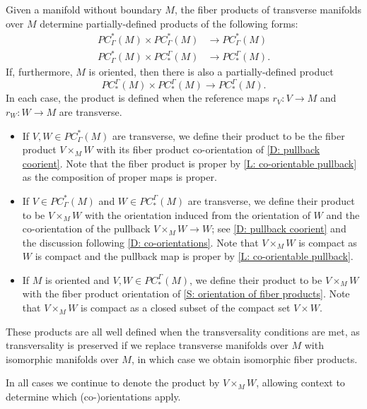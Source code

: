 \begin{definition}\label{D: PC products}
	Given a manifold without boundary $M$, the fiber products of transverse manifolds over $M$ determine partially-defined products of the following forms:
	\begin{align*}
		PC^*_\Gamma(M) \times PC^*_\Gamma(M)& \to PC^*_\Gamma(M)\\
		PC^*_\Gamma(M) \times PC_*^\Gamma(M)& \to PC_*^\Gamma(M).
	\end{align*}
	If, furthermore, $M$ is oriented, then there is also a partially-defined product
	$$PC_*^\Gamma(M) \times PC_*^\Gamma(M) \to PC_*^\Gamma(M).$$
	In each case, the product is defined when the reference maps $r_V \colon V \to M$ and $r_W \colon W \to M$ are transverse.

		\begin{itemize}
			\item If $V,W\in PC^*_\Gamma(M)$ are transverse, we define their product to be the fiber product $V \times_M W$ with its fiber product co-orientation of \cref{D: pullback coorient}. Note that the fiber product is proper by \cref{L: co-orientable pullback} as the composition of proper maps is proper.

			\item If $V \in PC^*_\Gamma(M)$ and $W \in PC_*^\Gamma(M)$ are transverse, we define their product to be $V \times_M W$ with the orientation induced from the orientation of $W$ and the co-orientation of the pullback $V \times_M W \to W$; see \cref{D: pullback coorient} and  the discussion following \cref{D: co-orientations}. 
			Note that $V \times_M W$ is compact as $W$ is compact and the pullback map is proper by \cref{L: co-orientable pullback}.

			\item If $M$ is oriented and $V,W \in PC_*^\Gamma(M)$, we define their product to be $V \times_M W$ with the fiber product orientation of \cref{S: orientation of fiber products}. 
			Note that $V \times_M W$ is compact as a closed subset of the compact set $V \times W$.
	\end{itemize}

	These products are all well defined when the transversality conditions are met, as transversality is preserved if we replace transverse manifolds over $M$ with isomorphic manifolds over $M$, in which case we obtain isomorphic fiber products. 

	In all cases we continue to denote the product by $V \times_M W$, allowing context to determine which (co-)orientations apply.
\end{definition}




